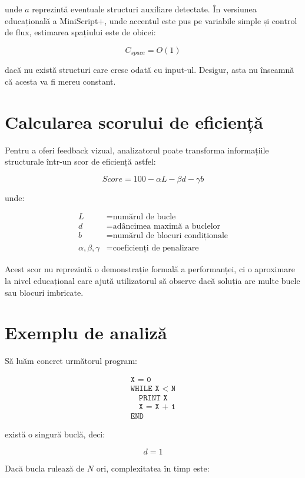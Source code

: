 \documentclass[12pt]{article}
\begin{document}
unde \(a\) reprezintă eventuale structuri auxiliare detectate. În versiunea educațională a MiniScript+, unde accentul este pus pe variabile simple și control de flux, estimarea spațiului este de obicei:

\[
C_{space} = O(1)
\]

dacă nu există structuri care cresc odată cu input-ul. Desigur, asta nu înseamnă că acesta va fi mereu constant.

\section{Calcularea scorului de eficiență}

Pentru a oferi feedback vizual, analizatorul poate transforma informațiile structurale într-un scor de eficiență astfel:

\[
Score = 100 - \alpha L - \beta d - \gamma b
\]

unde:

\[
\begin{aligned}
L &= \text{numărul de bucle} \\
d &= \text{adâncimea maximă a buclelor} \\
b &= \text{numărul de blocuri condiționale} \\
\alpha,\beta,\gamma &= \text{coeficienți de penalizare}
\end{aligned}
\]

Acest scor nu reprezintă o demonstrație formală a performanței, ci o aproximare la nivel educațional care ajută utilizatorul să observe dacă soluția are multe bucle sau blocuri imbricate.

\section{Exemplu de analiză}

Să luăm concret următorul program:

\[
\begin{array}{l}
\texttt{X = 0} \\
\texttt{WHILE X < N} \\
\quad \texttt{PRINT X} \\
\quad \texttt{X = X + 1} \\
\texttt{END}
\end{array}
\]

există o singură buclă, deci:

\[
d = 1
\]

Dacă bucla rulează de \(N\) ori, complexitatea în timp este:
\end{document}
